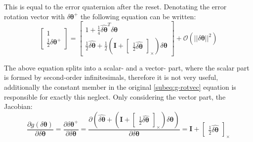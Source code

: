 This is equal to the error quaternion after the reset. Denotating the error rotation vector with $\delta\boldsymbol{\theta}^+$ the following equation can be written:
\begin{equation}
    \begin{bmatrix}
        1 \\ \frac{1}{2}\delta\boldsymbol{\theta}^+
    \end{bmatrix}=\begin{bmatrix}
        1+\frac{1}{4}\hat{\delta\boldsymbol{\theta}}^T\delta\boldsymbol{\theta} \\
        \frac{1}{2}\hat{\delta\boldsymbol{\theta}}+\frac{1}{2}\left(\mathbf{I}+\begin{bmatrix}
            \frac{1}{2}\hat{\delta\boldsymbol{\theta}}
        \end{bmatrix}_\times\right)\delta\boldsymbol{\theta}
    \end{bmatrix}+\mathcal{O}(||\delta\boldsymbol{\theta}||^2) 
\end{equation}

The above equation splits into a scalar- and a vector- part, where the scalar part is formed by second-order infinitesimals, therefore it is not very useful, additionally the constant member in the original \eqref{subeq:g-rotvec} equation is responsible for exactly this neglect. Only considering the vector part, the Jacobian:
\begin{equation}
    \frac{\partial g(\delta\boldsymbol{\theta})}{\partial\delta\boldsymbol{\theta}}=
    \frac{\partial\delta\boldsymbol{\theta}^+}{\partial\delta\boldsymbol{\theta}}=
    \frac{\partial\left(\hat{\delta\boldsymbol{\theta}}+\left(\mathbf{I}+\begin{bmatrix} \frac{1}{2}\hat{\delta\boldsymbol{\theta}} 
    \end{bmatrix}_\times\right)\delta\boldsymbol{\theta}\right)}{\partial\delta\boldsymbol{\theta}} =
    \mathbf{I}+\begin{bmatrix} \frac{1}{2}\hat{\delta\boldsymbol{\theta}} \end{bmatrix}_\times
\end{equation}